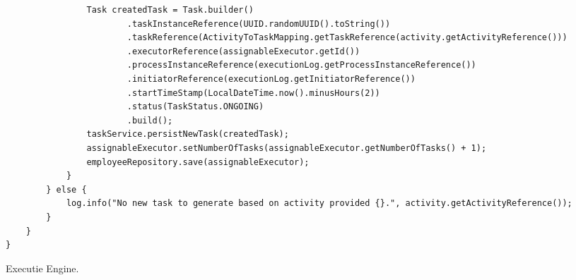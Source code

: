 \begin{listing}
\begin{verbatim}
                Task createdTask = Task.builder()
                        .taskInstanceReference(UUID.randomUUID().toString())
                        .taskReference(ActivityToTaskMapping.getTaskReference(activity.getActivityReference()))
                        .executorReference(assignableExecutor.getId())
                        .processInstanceReference(executionLog.getProcessInstanceReference())
                        .initiatorReference(executionLog.getInitiatorReference())
                        .startTimeStamp(LocalDateTime.now().minusHours(2))
                        .status(TaskStatus.ONGOING)
                        .build();
                taskService.persistNewTask(createdTask);
                assignableExecutor.setNumberOfTasks(assignableExecutor.getNumberOfTasks() + 1);
                employeeRepository.save(assignableExecutor);
            }
        } else {
            log.info("No new task to generate based on activity provided {}.", activity.getActivityReference());
        }
    }
}
  \end{verbatim}
  \caption[Executie Engine]{Executie Engine.}
\end{listing}